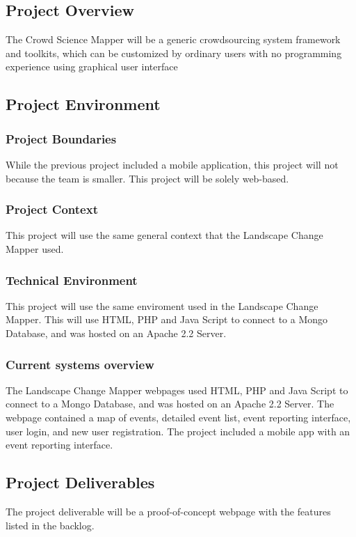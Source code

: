 \subsection{Project Overview}
The Crowd Science Mapper will be a generic crowdsourcing system framework and toolkits, which can be customized by ordinary users with no programming experience using graphical user interface
\subsection{Project Environment}
\subsubsection{Project Boundaries}
While the previous project included a mobile application, this project will not because the team is smaller. This project will be solely web-based. 
\subsubsection{Project Context}
This project will use the same general context that the Landscape Change Mapper used.  
\subsubsection{Technical Environment}
This project will use the same enviroment used in the Landscape Change Mapper. This will use HTML, PHP and Java Script to connect to a Mongo Database, and was hosted on an Apache 2.2 Server.
\subsubsection{Current systems overview}
The Landscape Change Mapper webpages used HTML, PHP and Java Script to connect to a Mongo Database, and was hosted on an Apache 2.2 Server. The webpage contained a map of events, detailed event list, event reporting interface, user login, and new user registration. The project included a mobile app with an event reporting interface. 
\subsection{Project Deliverables}
The project deliverable will be a proof-of-concept webpage with the features listed in the backlog.
